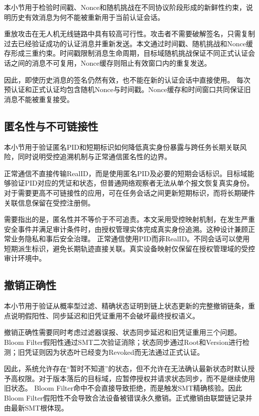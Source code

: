 \documentclass[conference]{IEEEtran}
\begin{document}
	本小节用于检验时间戳、Nonce和随机挑战在不同协议阶段形成的新鲜性约束，说明历史有效消息为何不能被重新用于当前认证会话。
	
	重放攻击在无人机无线链路中具有较高可行性。攻击者不需要破解签名，只需复制过去已经验证成功的认证消息并重新发送。本文通过时间戳、随机挑战和Nonce缓存形成三重约束。时间戳限制消息生命周期，目标域随机挑战保证不同正式认证会话之间的消息不可复用，Nonce缓存则阻止有效窗口内的重复发送。
	
	因此，即使历史消息的签名仍然有效，也不能在新的认证会话中直接使用。
	每次预认证和正式认证均包含随机Nonce与时间戳。Nonce缓存和时间窗口共同保证旧消息不能被重复接受。
	
	\subsection{匿名性与不可链接性}
	
	本小节用于验证匿名PID和短期标识如何降低真实身份暴露与跨任务长期关联风险，同时说明受控追溯机制与正常通信匿名性的边界。
	
	正常通信不直接传输RealID，而是使用匿名PID及必要的短期会话标识。目标域能够验证PID对应的凭证和状态，但普通网络观察者无法从单个报文恢复真实身份。对于需要更高不可链接性的应用，可在任务会话之间更新短期标识，而将长期硬件关联信息保留在受控注册侧。
	
	需要指出的是，匿名性并不等价于不可追责。本文采用受控映射机制，在发生严重安全事件并满足审计条件时，由授权管理实体完成真实身份追溯。这种设计兼顾正常业务隐私和事后安全治理。
	正常通信使用PID而非RealID。不同会话可以使用短期派生标识，避免长期轨迹直接关联。真实设备映射仅保留在授权管理域的受控审计环境中。
	
	\subsection{撤销正确性}
	
	本小节用于验证从概率型过滤、精确状态证明到链上状态更新的完整撤销链条，重点说明假阳性、同步延迟和旧凭证重用不会破坏最终授权语义。
	
	撤销正确性需要同时考虑过滤器误报、状态同步延迟和旧凭证重用三个问题。Bloom Filter假阳性通过SMT二次验证消除；状态同步通过Root和Version进行检测；旧凭证则因为状态叶已经变为Revoked而无法通过正式认证。
	
	因此，系统允许存在“暂时不知道”的状态，但不允许在无法确认最新状态时默认授予高权限。对于版本落后的目标域，应暂停授权并请求状态同步，而不是继续使用旧状态。
	Bloom Filter命中不会直接导致拒绝，而是触发SMT精确核验。因此Bloom Filter假阳性不会导致合法设备被错误永久撤销。正式撤销由联盟链记录并由最新SMT根体现。
	
\end{document}
